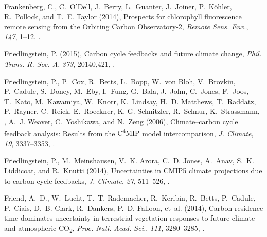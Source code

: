 \documentclass[draft]{agujournal}
\begin{document}
\begin{thebibliography}{196}
Frankenberg, C., C.~O'Dell, J.~Berry, L.~Guanter, J.~Joiner, P.~K{\"o}hler,
  R.~Pollock, and T.~E. Taylor (2014), Prospects for chlorophyll fluorescence
  remote sensing from the {O}rbiting {C}arbon {O}bservatory-2, \textit{Remote
  Sens. Env.}, \textit{147}, 1--12, .

Friedlingstein, P. (2015), Carbon cycle feedbacks and future climate change,
  \textit{Phil. Trans. R. Soc. A}, \textit{373}, 20140,421,
  .

Friedlingstein, P., P.~Cox, R.~Betts, L.~Bopp, W.~von Bloh, V.~Brovkin,
  P.~Cadule, S.~Doney, M.~Eby, I.~Fung, G.~Bala, J.~John, C.~Jones, F.~Joos,
  T.~Kato, M.~Kawamiya, W.~Knorr, K.~Lindsay, H.~D. Matthews, T.~Raddatz,
  P.~Rayner, C.~Reick, E.~Roeckner, K.-G. Schnitzler, R.~Schnur, K.~Strassmann,
  , A.~J. Weaver, C.~Yoshikawa, and N.~Zeng (2006), Climate--carbon cycle
  feedback analysis: Results from the {C\textsuperscript{4}MIP} model
  intercomparison, \textit{J. Climate}, \textit{19}, 3337--3353,
  .

Friedlingstein, P., M.~Meinshausen, V.~K. Arora, C.~D. Jones, A.~Anav, S.~K.
  Liddicoat, and R.~Knutti (2014), Uncertainties in {CMIP5} climate projections
  due to carbon cycle feedbacks, \textit{J. Climate}, \textit{27}, 511--526,
  .

Friend, A.~D., W.~Lucht, T.~T. Rademacher, R.~Keribin, R.~Betts, P.~Cadule,
  P.~Ciais, D.~B. Clark, R.~Dankers, P.~D. Falloon, et~al. (2014), Carbon
  residence time dominates uncertainty in terrestrial vegetation responses to
  future climate and atmospheric {CO\textsubscript{2}}, \textit{Proc. Natl.
  Acad. Sci.}, \textit{111}, 3280--3285, .


\end{thebibliography}
\end{document}
